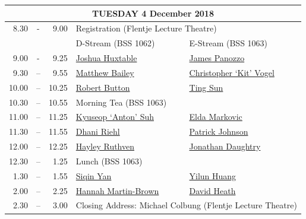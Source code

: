 \documentclass[twoside,12pt,a4paper,notitlepage]{memoir}
\begin{document}
\pagebreak
\vspace*{0cm}
\begin{center}
\begin{tabular}{rcr|p{3.6cm}|p{3.6cm}}
\multicolumn{5}{c}{{\large TUESDAY 4 December 2018}} \\ \hline
8.30 & - & 9.00 & \multicolumn{2}{l}{Registration (Flentje Lecture Theatre)} \\ \hline
 & & & D-Stream \hspace{1cm} (BSS 1062) & E-Stream \hspace{1cm} (BSS 1063) \\ \hline
9.00 & - & 9.25 &
 \hyperref[aut:huxtable]{Joshua Huxtable} &
\hyperref[aut:panozzo]{James Panozzo} \\ \hline
9.30 & – & 9.55 &
 \hyperref[aut:bailey]{Matthew Bailey} &
 \hyperref[aut:vogel]{Christopher `Kit' Vogel}  \\ \hline
10.00 & – & 10.25 &
 \hyperref[aut:button]{Robert Button} &
\hyperref[aut:sun]{Ting Sun} \\ \hline
10.30 & – & 10.55 & \multicolumn{2}{l}{Morning Tea (BSS 1063)} \\ \hline
11.00 & – & 11.25 & 
\hyperref[aut:suh]{Kyuseop `Anton' Suh} &
 \hyperref[aut:markovic]{Elda Markovic} \\ \hline
11.30 & – & 11.55 &
 \hyperref[aut:riehl]{Dhani Riehl} &
 \hyperref[aut:johnson]{Patrick Johnson} \\ \hline
12.00 & – & 12.25 &
 \hyperref[aut:ruthven]{Hayley Ruthven} &
 \hyperref[aut:daughtry]{Jonathan Daughtry} \\ \hline
12.30 & – & 1.25 & \multicolumn{2}{l}{Lunch (BSS 1063)} \\ \hline
1.30 & – & 1.55 &
 \hyperref[aut:yan]{Siqin Yan} &
 \hyperref[aut:huang]{Yilun Huang} \\ \hline
2.00 & – & 2.25 & 
 \hyperref[aut:brown]{Hannah Martin-Brown} &
 \hyperref[aut:heath]{David Heath} \\ \hline
2.30 & – & 3.00 & \multicolumn{2}{l}{Closing Address: Michael Colbung (Flentje Lecture Theatre)} \\ \hline
\end{tabular}
\end{center}
\end{document}
